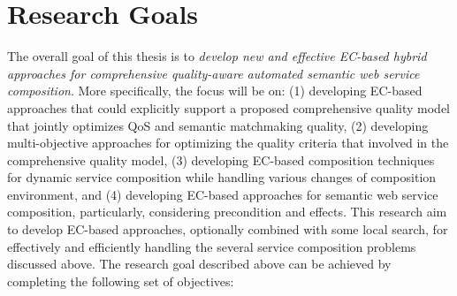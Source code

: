 \section{Research Goals}
The overall goal of this thesis is to \emph{develop new and effective EC-based hybrid approaches for comprehensive quality-aware automated semantic web service composition}. More specifically, the focus will be on: (1) developing EC-based approaches that could explicitly support a proposed comprehensive quality model that jointly optimizes QoS and semantic matchmaking quality, (2) developing multi-objective approaches for optimizing the quality criteria that involved in the comprehensive quality model, (3) developing EC-based composition techniques for dynamic service composition while handling various changes of composition environment, and  (4) developing EC-based approaches for semantic web service composition, particularly, considering precondition and effects. This research aim to develop EC-based approaches, optionally combined with some local search, for effectively and efficiently handling the several service composition problems discussed above. The research goal described above can be achieved by completing the following set of objectives:


